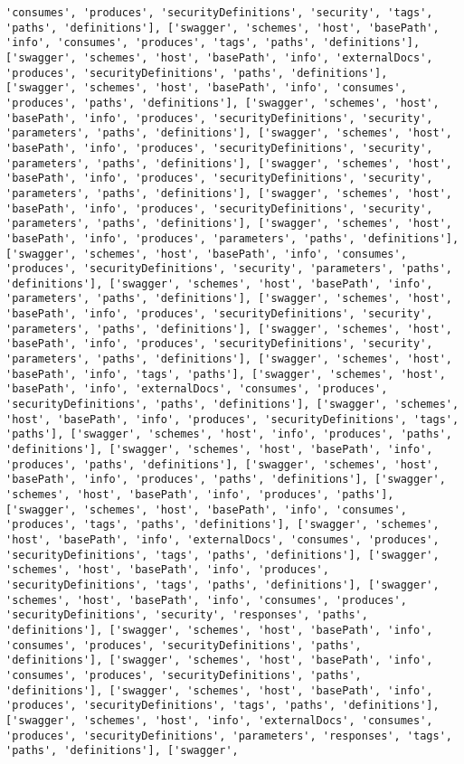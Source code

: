 \documentclass[11pt]{article}
\begin{document}
\begin{Verbatim}[commandchars=\\\{\}]
'consumes', 'produces', 'securityDefinitions', 'security', 'tags', 'paths', 'definitions'], ['swagger', 'schemes', 'host', 'basePath', 'info', 'consumes', 'produces', 'tags', 'paths', 'definitions'], ['swagger', 'schemes', 'host', 'basePath', 'info', 'externalDocs', 'produces', 'securityDefinitions', 'paths', 'definitions'], ['swagger', 'schemes', 'host', 'basePath', 'info', 'consumes', 'produces', 'paths', 'definitions'], ['swagger', 'schemes', 'host', 'basePath', 'info', 'produces', 'securityDefinitions', 'security', 'parameters', 'paths', 'definitions'], ['swagger', 'schemes', 'host', 'basePath', 'info', 'produces', 'securityDefinitions', 'security', 'parameters', 'paths', 'definitions'], ['swagger', 'schemes', 'host', 'basePath', 'info', 'produces', 'securityDefinitions', 'security', 'parameters', 'paths', 'definitions'], ['swagger', 'schemes', 'host', 'basePath', 'info', 'produces', 'securityDefinitions', 'security', 'parameters', 'paths', 'definitions'], ['swagger', 'schemes', 'host', 'basePath', 'info', 'produces', 'parameters', 'paths', 'definitions'], ['swagger', 'schemes', 'host', 'basePath', 'info', 'consumes', 'produces', 'securityDefinitions', 'security', 'parameters', 'paths', 'definitions'], ['swagger', 'schemes', 'host', 'basePath', 'info', 'parameters', 'paths', 'definitions'], ['swagger', 'schemes', 'host', 'basePath', 'info', 'produces', 'securityDefinitions', 'security', 'parameters', 'paths', 'definitions'], ['swagger', 'schemes', 'host', 'basePath', 'info', 'produces', 'securityDefinitions', 'security', 'parameters', 'paths', 'definitions'], ['swagger', 'schemes', 'host', 'basePath', 'info', 'tags', 'paths'], ['swagger', 'schemes', 'host', 'basePath', 'info', 'externalDocs', 'consumes', 'produces', 'securityDefinitions', 'paths', 'definitions'], ['swagger', 'schemes', 'host', 'basePath', 'info', 'produces', 'securityDefinitions', 'tags', 'paths'], ['swagger', 'schemes', 'host', 'info', 'produces', 'paths', 'definitions'], ['swagger', 'schemes', 'host', 'basePath', 'info', 'produces', 'paths', 'definitions'], ['swagger', 'schemes', 'host', 'basePath', 'info', 'produces', 'paths', 'definitions'], ['swagger', 'schemes', 'host', 'basePath', 'info', 'produces', 'paths'], ['swagger', 'schemes', 'host', 'basePath', 'info', 'consumes', 'produces', 'tags', 'paths', 'definitions'], ['swagger', 'schemes', 'host', 'basePath', 'info', 'externalDocs', 'consumes', 'produces', 'securityDefinitions', 'tags', 'paths', 'definitions'], ['swagger', 'schemes', 'host', 'basePath', 'info', 'produces', 'securityDefinitions', 'tags', 'paths', 'definitions'], ['swagger', 'schemes', 'host', 'basePath', 'info', 'consumes', 'produces', 'securityDefinitions', 'security', 'responses', 'paths', 'definitions'], ['swagger', 'schemes', 'host', 'basePath', 'info', 'consumes', 'produces', 'securityDefinitions', 'paths', 'definitions'], ['swagger', 'schemes', 'host', 'basePath', 'info', 'consumes', 'produces', 'securityDefinitions', 'paths', 'definitions'], ['swagger', 'schemes', 'host', 'basePath', 'info', 'produces', 'securityDefinitions', 'tags', 'paths', 'definitions'], ['swagger', 'schemes', 'host', 'info', 'externalDocs', 'consumes', 'produces', 'securityDefinitions', 'parameters', 'responses', 'tags', 'paths', 'definitions'], ['swagger', 
\end{Verbatim}
\end{document}
